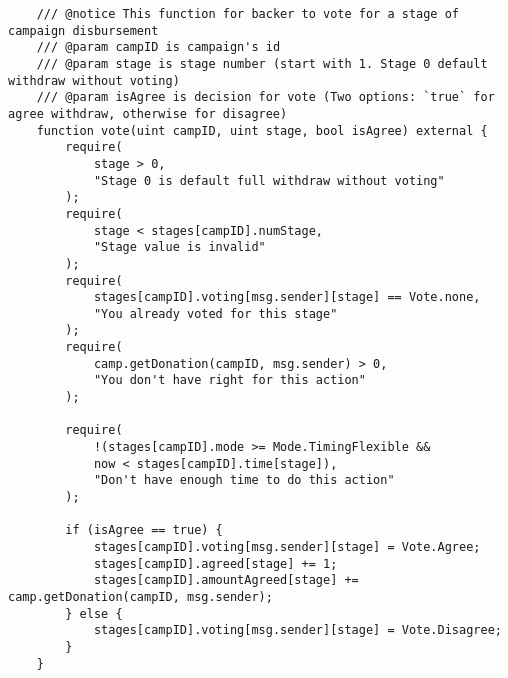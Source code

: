 \documentclass[../main-report.tex]{subfiles}
\begin{document}
\begin{lstlisting}
    /// @notice This function for backer to vote for a stage of campaign disbursement
    /// @param campID is campaign's id
    /// @param stage is stage number (start with 1. Stage 0 default withdraw without voting)
    /// @param isAgree is decision for vote (Two options: `true` for agree withdraw, otherwise for disagree)
    function vote(uint campID, uint stage, bool isAgree) external {
        require(
            stage > 0,
            "Stage 0 is default full withdraw without voting"
        );
        require(
            stage < stages[campID].numStage,
            "Stage value is invalid"
        );
        require(
            stages[campID].voting[msg.sender][stage] == Vote.none,
            "You already voted for this stage"
        );
        require(
            camp.getDonation(campID, msg.sender) > 0,
            "You don't have right for this action"
        );

        require(
            !(stages[campID].mode >= Mode.TimingFlexible &&
            now < stages[campID].time[stage]),
            "Don't have enough time to do this action"
        );

        if (isAgree == true) {
            stages[campID].voting[msg.sender][stage] = Vote.Agree;
            stages[campID].agreed[stage] += 1;
            stages[campID].amountAgreed[stage] += camp.getDonation(campID, msg.sender);
        } else {
            stages[campID].voting[msg.sender][stage] = Vote.Disagree;
        }
    }


\end{lstlisting}
\end{document}
